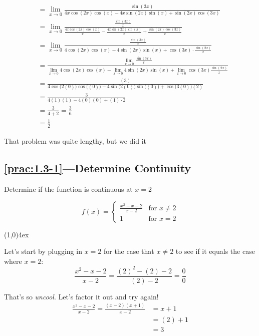 \documentclass{MathNotes}
\newcommand{\br}{
\begin{center}
\line(1,0){4ex}
\end{center}}
\begin{document}
\begin{align*}
    &=\lim_{x\to 0}\frac{\sin(3x)}{4x\cos(2x)\cos(x)-4x\sin(2x)\sin(x)+\sin(2x)\cos(3x)}\\
    &=\lim_{x\to 0}\frac{\frac{\sin(3x)}{x}}{\frac{4x\cos(2x)\cos(x)}{x}-\frac{4x\sin(2x)\sin(x)}{x}+\frac{\sin(2x)\cos(3x)}{x}}\\
    &=\lim_{x\to 0}\frac{\frac{\sin(3x)}{x}}{4\cos(2x)\cos(x)-4\sin(2x)\sin(x)+\cos(3x)\cdot\frac{\sin(2x)}{x}}\\
    &=\frac{\lim_{x\to 0}\frac{\sin(3x)}{x}}{\lim_{x\to 0}4\cos(2x)\cos(x)-\lim_{x\to 0}4\sin(2x)\sin(x)+\lim_{x\to 0}\cos(3x)\frac{\sin(2x)}{x}}\\
    &=\frac{(3)}{4\cos\big(2(0)\big)\cos\big((0)\big)-4\sin\big(2(0)\big)\sin\big((0)\big)+\cos\big(3(0)\big)(2)}\\
    &=\frac{3}{4(1)(1)-4(0)(0)+(1)\cdot 2}\\
    &=\frac{3}{4+2}=\frac{3}{6}\\
    &=\frac{1}{2}
\end{align*}

That problem was quite lengthy, but we did it 

\subsection*{\ref{prac:1.3-1}---Determine Continuity}\label{ans:1.3-1}
Determine if the function is continuous at $x=2$

\begin{displaymath}
    f(x) = \begin{cases}
        \frac{x^2-x-2}{x-2} &\text{for } x\neq 2\\
        1 &\text{for } x=2
    \end{cases}
\end{displaymath}
\br

Let's start by plugging in $x=2$ for the case that $x\neq2$ to see if it equals
the case where $x=2$:
\begin{displaymath}
    \frac{x^2-x-2}{x-2}=\frac{(2)^2-(2)-2}{(2)-2}=\frac{0}{0}
\end{displaymath}

That's so \textit{uncool}. Let's factor it out and try again!
\begin{align*}
    \frac{x^2-x-2}{x-2} = \frac{(x-2)(x+1)}{x-2} &= x+1\\
    &=(2)+1\\
    &=3
\end{align*}
\end{document}
